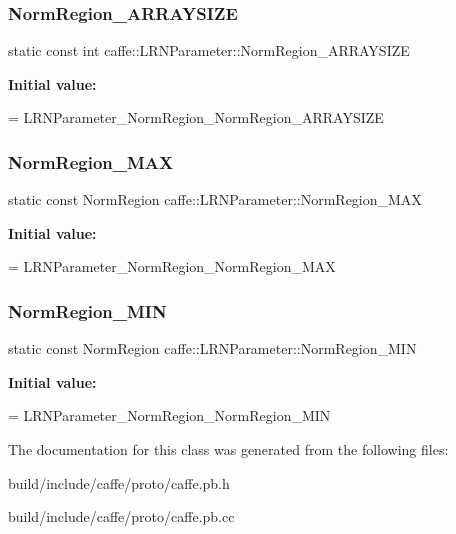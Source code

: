 \subsubsection{\texorpdfstring{Norm\+Region\+\_\+\+A\+R\+R\+A\+Y\+S\+I\+ZE}{NormRegion\_ARRAYSIZE}}
{\footnotesize\ttfamily static const int caffe\+::\+L\+R\+N\+Parameter\+::\+Norm\+Region\+\_\+\+A\+R\+R\+A\+Y\+S\+I\+ZE\hspace{0.3cm}{\ttfamily [static]}}

{\bfseries Initial value\+:}
\begin{DoxyCode}
=
    LRNParameter\_NormRegion\_NormRegion\_ARRAYSIZE
\end{DoxyCode}
\mbox{\label{classcaffe_1_1_l_r_n_parameter_af7e2ac9b3ea9ef429bd63532c5de842d}} 
\subsubsection{\texorpdfstring{Norm\+Region\+\_\+\+M\+AX}{NormRegion\_MAX}}
{\footnotesize\ttfamily static const Norm\+Region caffe\+::\+L\+R\+N\+Parameter\+::\+Norm\+Region\+\_\+\+M\+AX\hspace{0.3cm}{\ttfamily [static]}}

{\bfseries Initial value\+:}
\begin{DoxyCode}
=
    LRNParameter\_NormRegion\_NormRegion\_MAX
\end{DoxyCode}
\mbox{\label{classcaffe_1_1_l_r_n_parameter_a2c9eb640b3113f7abda72b659df4e076}} 
\subsubsection{\texorpdfstring{Norm\+Region\+\_\+\+M\+IN}{NormRegion\_MIN}}
{\footnotesize\ttfamily static const Norm\+Region caffe\+::\+L\+R\+N\+Parameter\+::\+Norm\+Region\+\_\+\+M\+IN\hspace{0.3cm}{\ttfamily [static]}}

{\bfseries Initial value\+:}
\begin{DoxyCode}
=
    LRNParameter\_NormRegion\_NormRegion\_MIN
\end{DoxyCode}


The documentation for this class was generated from the following files\+:\begin{DoxyCompactItemize}
\item 
build/include/caffe/proto/caffe.\+pb.\+h\item 
build/include/caffe/proto/caffe.\+pb.\+cc\end{DoxyCompactItemize}

